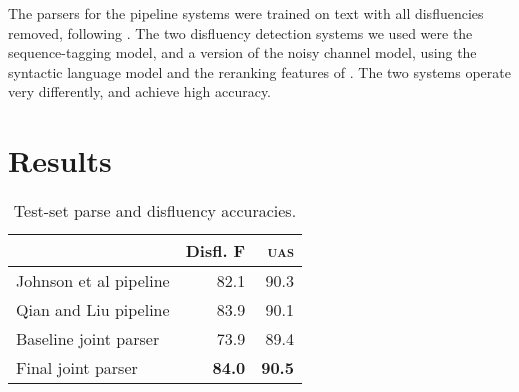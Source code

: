 \documentclass[11pt,letterpaper]{article}
\begin{document}
The parsers for the pipeline systems were trained on text with all disfluencies
removed, following \citet{Charniak01a}. 
The two disfluency detection systems we used were the \citet{qian:13} sequence-tagging
model, and a version of the \citet{Johnson04a} noisy channel model, using the
\citet{Charniak01b} syntactic language model and the reranking features of
\citet{zwarts:11}. The two systems operate very differently, and achieve high
accuracy.




\section{Results}
\label{sec:results}

\begin{table}
    \small
    \centering
    \begin{tabular}{l|r|r}
        & Disfl. F & \textsc{uas} \\
        \hline \hline
Johnson et al pipeline      & 82.1 & 90.3 \\ 
Qian and Liu  pipeline     & 83.9 & 90.1  \\
\hline
Baseline joint parser & 73.9 & 89.4 \\
Final joint parser    & \textbf{84.0} & \textbf{90.5} \\
\hline
    \end{tabular}
    \caption{Test-set parse and disfluency accuracies.\label{tab:test}}
\vspace*{-1.0ex}
\end{table}
\end{document}
